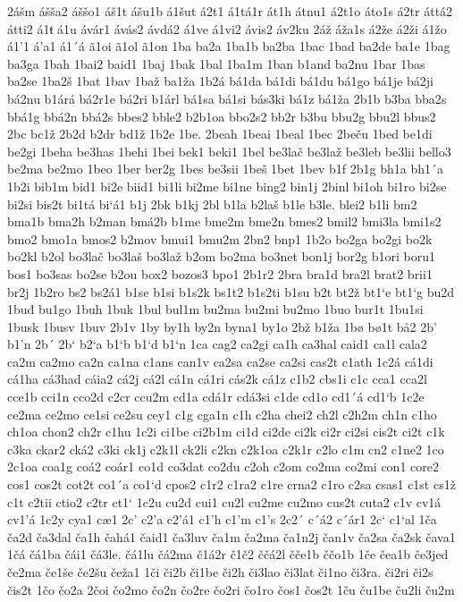 2ášm
ášša2
áššo1
áš1t
ášu1b
á1šut
á2t1
á1tá1r
át1h
átnu1
á2t1o
áto1s
á2tr
áttá2
átti2
á1ŧ
á1u
ávár1
ávás2
ávdá2
á1ve
á1vi2
ávis2
áv2ku
2áž
áža1s
á2že
á2ži
á1žo
á1'1
á'a1
á1´á
ã1oi
ã1ol
ã1on
1ba
ba2a
1ba1b
ba2ba
1bac
1bad
ba2de
ba1e
1bag
ba3ga
1bah
1bai2
baid1
1baj
1bak
1bal
1ba1m
1ban
b1and
ba2nu
1bar
1bas
ba2se
1ba2š
1bat
1bav
1baž
ba1ža
1b2á
bá1da
bá1di
bá1du
bá1go
bá1je
bá2ji
bá2nu
b1árá
bá2r1e
bá2ri
b1árl
bá1sa
bá1si
bás3ki
bá1z
bá1ža
2b1b
b3ba
bba2s
bbá1g
bbá2n
bbá2s
bbes2
bble2
b2b1oa
bbo2s2
bb2r
b3bu
bbu2g
bbu2l
bbus2
2bc
bc1ž
2b2d
b2dr
bd1ž
1b2e
1be.
2beah
1beai
1beal
1bec
2beču
1bed
be1di
be2gi
1beha
be3has
1behi
1bei
bek1
beki1
1bel
be3lač
be3laž
be3leb
be3lii
bello3
be2ma
be2mo
1beo
1ber
ber2g
1bes
be3sii
1beš
1bet
1bev
b1f
2b1g
bh1a
bh1´a
1b2i
bib1m
bid1
bi2e
biid1
bi1li
bi2me
bi1ne
bing2
bin1j
2binl
bi1oh
bi1ro
bi2se
bi2si
bis2t
bi1tá
bi`á1
b1j
2bk
b1kj
2bl
b1la
b2laš
b1le
b3le.
blei2
b1li
bm2
bma1b
bma2h
b2man
bmá2b
b1me
bme2m
bme2n
bmes2
bmil2
bmi3la
bmi1s2
bmo2
bmo1a
bmos2
b2mov
bmui1
bmu2m
2bn2
bnp1
1b2o
bo2ga
bo2gi
bo2k
bo2kl
b2ol
bo3lač
bo3laš
bo3laž
b2om
bo2ma
bo3net
bon1j
bor2g
b1ori
boru1
bos1
bo3sas
bo2se
b2ou
box2
bozos3
bpo1
2b1r2
2bra
bra1d
bra2l
brat2
brii1
br2j
1b2ro
bs2
bs2á1
b1se
b1si
b1s2k
bs1t2
b1s2ti
b1su
b2t
bt2ž
bt1`e
bt1`g
bu2d
1buđ
bu1go
1buh
1buk
1bul
bul1m
bu2ma
bu2mi
bu2mo
1buo
bur1t
1bu1si
1busk
1busv
1buv
2b1v
1by
by1h
by2n
byna1
by1o
2bž
b1ža
1bø
bø1t
bå2
2b'
b1'n
2b´
2b`
b2`a
b1`b
b1`d
b1`n
1ca
cag2
ca2gi
ca1h
ca3hal
caid1
ca1l
cala2
ca2m
ca2mo
ca2n
ca1na
c1ans
can1v
ca2sa
ca2se
ca2si
cas2t
c1ath
1c2á
cá1di
cá1ha
cá3had
cáia2
cá2j
cá2l
cá1n
cá1ri
cás2k
cá1z
c1b2
cbs1i
c1c
cca1
cca2l
cce1b
cci1n
cco2d
c2cr
ccu2m
cd1a
cdá1r
cdá3si
c1de
cd1o
cd1´á
cd1`b
1c2e
ce2ma
ce2mo
ce1si
ce2su
cey1
c1g
cga1n
c1h
c2ha
chei2
ch2l
c2h2m
ch1n
c1ho
ch1oa
chon2
ch2r
c1hu
1c2i
ci1be
ci2b1m
ci1d
ci2de
ci2k
ci2r
ci2si
cis2t
ci2t
c1k
c3ka
ckar2
cká2
c3ki
ck1j
c2k1l
ck2li
c2kn
c2k1oa
c2k1r
c2lo
c1m
cn2
c1ne2
1co
2c1oa
coa1g
coá2
coár1
co1d
co3dat
co2du
c2oh
c2om
co2ma
co2mi
con1
core2
cos1
cos2t
cot2t
co1´a
co1`d
cpos2
c1r2
c1ra2
c1re
crna2
c1ro
c2sa
csas1
c1st
cs1ž
c1t
c2tii
ctio2
c2tr
ct1`
1c2u
cu2d
cui1
cu2l
cu2me
cu2mo
cus2t
cuta2
c1v
cv1á
cv1'á
1c2y
cya1
cæ1
2c'
c2'a
c2'á1
c1'h
c1'm
c1's
2c2´
c´á2
c´ár1
2c`
c1`al
1ča
ča2d
ča3dal
ča1h
čahá1
čaid1
ča3luv
ča1m
ča2ma
ča1n2j
čan1v
ča2sa
ča2sk
čava1
1čá
čá1ba
čái1
čá3le.
čá1lu
čá2ma
č1á2r
č1č2
ččá2l
čče1b
ččo1b
1če
čea1b
če3jed
če2ma
če1še
če2šu
čeža1
1či
či2b
či1be
či2h
či3lao
či3lat
či1no
či3ra.
či2ri
či2s
čis2t
1čo
čo2a
2čoi
čo2mo
čo2n
čo2re
čo2ri
čo1ro
čos1
čos2t
1ču
ču1be
ču2li
ču2m
